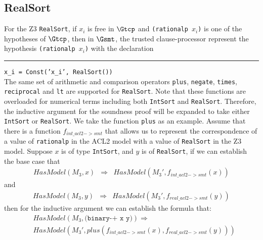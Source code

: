 \subsection{RealSort}\label{subsec:reals}
For the Z3 \texttt{RealSort}, if $x_i$ is free in $\Gtcp$ and
\texttt{(rationalp $x_i$)}  is one of the hypotheses of $\Gtcp$,
then in $\Gsmt$, the trusted clause-processor represent the hypothesis
\texttt{(rationalp $x_i$)} with the declaration\\
\rule{2em}{0ex}\texttt{x\_i = Const('x\_i', RealSort())}\\

The same set of arithmetic and comparison operators \texttt{plus},
\texttt{negate}, \texttt{times}, \texttt{reciprocal} and \texttt{lt} are
supported for \texttt{RealSort}. Note that these functions are overloaded for
numerical terms including both \texttt{IntSort} and \texttt{RealSort}.
Therefore, the inductive argument for the soundness proof will be expanded to
take either \texttt{IntSort} or \texttt{RealSort}. We take the function
\texttt{plus} as an example.
Assume that there is a function $f_{int\_acl2->smt}$ that allows us to represent
the correspondence of a value of \texttt{rationalp} in the ACL2 model with a
value of \texttt{RealSort} in the Z3 model.
Suppose $x$ is of type \texttt{IntSort}, and $y$ is of \texttt{RealSort}, if we
can establish the base case that
\begin{equation}\label{eq:realsortplusbase}\begin{array}{rcl}
HasModel(M_3, x) &\Rightarrow& HasModel(M_3', f_{int\_acl2->smt}(x))
\end{array}\end{equation}
and
\begin{equation}\label{eq:realsortplusbase}\begin{array}{rcl}
HasModel(M_3, y) &\Rightarrow& HasModel(M_3', f_{real\_acl2->smt}(y))
\end{array}\end{equation}
then for the inductive argument we can establish the formula that:
\begin{equation}\label{eq:realsortplusinductive}\begin{array}{rcl}
&HasModel(M_3, \texttt{(binary-+ x y)}) \Rightarrow \\
&HasModel(M_3', plus(f_{int\_acl2->smt}(x), f_{real\_acl2->smt}(y)))
\end{array}\end{equation}

